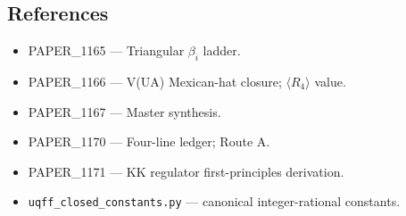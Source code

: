 \documentclass[
]{article}
\providecommand{\tightlist}{%
  \setlength{\itemsep}{0pt}\setlength{\parskip}{0pt}}
\begin{document}
\subsection{References}\label{references}

\begin{itemize}
\tightlist
\item
  PAPER\_1165 --- Triangular \(\beta_{i}\) ladder.
\item
  PAPER\_1166 --- V(UA) Mexican-hat closure; \(\langle R_{4}\rangle\)
  value.
\item
  PAPER\_1167 --- Master synthesis.
\item
  PAPER\_1170 --- Four-line ledger; Route A.
\item
  PAPER\_1171 --- KK regulator first-principles derivation.
\item
  \texttt{uqff\_closed\_constants.py} --- canonical integer-rational
  constants.
\end{itemize}




\end{document}
